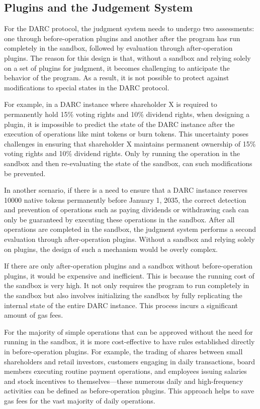 \documentclass[main.tex]{subfiles}
\begin{document}
\subsection{Plugins and the Judgement System}

For the DARC protocol, the judgment system needs to undergo two assessments: one through before-operation plugins and another after the program has run completely in the sandbox, followed by evaluation through after-operation plugins. The reason for this design is that, without a sandbox and relying solely on a set of plugins for judgment, it becomes challenging to anticipate the behavior of the program. As a result, it is not possible to protect against modifications to special states in the DARC protocol.

For example, in a DARC instance where shareholder X is required to permanently hold 15\% voting rights and 10\% dividend rights, when designing a plugin, it is impossible to predict the state of the DARC instance after the execution of operations like mint tokens or burn tokens. This uncertainty poses challenges in ensuring that shareholder X maintains permanent ownership of 15\% voting rights and 10\% dividend rights. Only by running the operation in the sandbox and then re-evaluating the state of the sandbox, can such modifications be prevented.

In another scenario, if there is a need to ensure that a DARC instance reserves 10000 native tokens permanently before January 1, 2035, the correct detection and prevention of operations such as paying dividends or withdrawing cash can only be guaranteed by executing these operations in the sandbox. After all operations are completed in the sandbox, the judgment system performs a second evaluation through after-operation plugins. Without a sandbox and relying solely on plugins, the design of such a mechanism would be overly complex.


If there are only after-operation plugins and a sandbox without before-operation plugins, it would be expensive and inefficient. This is because the running cost of the sandbox is very high. It not only requires the program to run completely in the sandbox but also involves initializing the sandbox by fully replicating the internal state of the entire DARC instance. This process incurs a significant amount of gas fees.

For the majority of simple operations that can be approved without the need for running in the sandbox, it is more cost-effective to have rules established directly in before-operation plugins. For example, the trading of shares between small shareholders and retail investors, customers engaging in daily transactions, board members executing routine payment operations, and employees issuing salaries and stock incentives to themselves—these numerous daily and high-frequency activities can be defined as before-operation plugins. This approach helps to save gas fees for the vast majority of daily operations.
\end{document}

